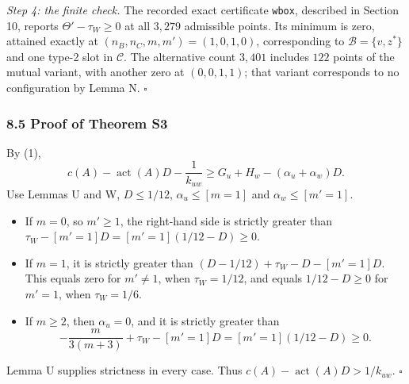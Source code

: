 \emph{Step 4: the finite check.}
The recorded exact certificate \texttt{wbox}, described in Section 10, reports
$\Theta'-\tau_W\ge0$ at all $3{,}279$ admissible points. Its minimum is zero, attained exactly at
$(n_B,n_C,m,m')=(1,0,1,0)$, corresponding to $\mathcal B=\{v,z^*\}$ and one type-2 slot in $\mathcal C$.
The alternative count $3{,}401$ includes $122$ points of the mutual variant, with another zero at $(0,0,1,1)$; that variant corresponds to no configuration by Lemma N.
\hfill$\square$

\subsubsection*{8.5 Proof of Theorem S3}
By (1),
\[
 c(A)-\operatorname{act}(A)D-\frac1{k_{uw}}
 \ge G_u+H_w-(\alpha_u+\alpha_w)D.
\]
Use Lemmas U and W, $D\le1/12$, $\alpha_u\le[m=1]$ and $\alpha_w\le[m'=1]$.
\begin{itemize}
\item If $m=0$, so $m'\ge1$, the right-hand side is strictly greater than
$\tau_W-[m'=1]D=[m'=1](1/12-D)\ge0$.
\item If $m=1$, it is strictly greater than
$(D-1/12)+\tau_W-D-[m'=1]D$.
This equals zero for $m'\ne1$, when $\tau_W=1/12$, and equals $1/12-D\ge0$ for $m'=1$, when $\tau_W=1/6$.
\item If $m\ge2$, then $\alpha_u=0$, and it is strictly greater than
\[
 -\frac m{3(m+3)}+\tau_W-[m'=1]D=[m'=1](1/12-D)\ge0.
\]
\end{itemize}
Lemma U supplies strictness in every case. Thus $c(A)-\operatorname{act}(A)D>1/k_{uw}$.
\hfill$\square$
